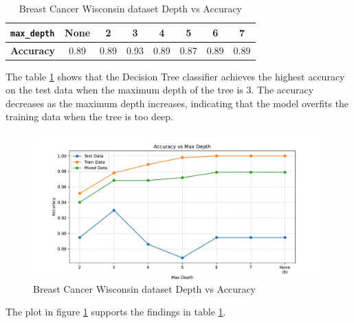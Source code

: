 \begin{table}[H]
    \centering
    \begin{tabular}{|l|c|c|c|c|c|c|c|}
        \hline
        \textbf{\texttt{max\_depth}} & None & 2 & 3 & 4 & 5 & 6 & 7 \\ \hline
        \textbf{Accuracy} & 0.89 & 0.89 & 0.93 & 0.89 & 0.87 & 0.89 & 0.89 \\ \hline
    \end{tabular}
    \caption{Breast Cancer Wisconsin dataset Depth vs Accuracy}
    \label{tab:breast_cancer_wisconsin_depth_vs_accuracy}
\end{table}

The table \ref{tab:breast_cancer_wisconsin_depth_vs_accuracy} shows that the Decision Tree classifier achieves the highest accuracy on the test data when the maximum depth of the tree is 3. The accuracy decreases as the maximum depth increases, indicating that the model overfits the training data when the tree is too deep.

\begin{figure}[H]
    \centering
    \includegraphics[width=\textwidth]{figures/breast_cancer_wisconsin_accuracy_vs_max_depth.pdf}
    \caption{Breast Cancer Wisconsin dataset Depth vs Accuracy}
    \label{fig:breast_cancer_wisconsin_depth_vs_accuracy}
\end{figure}

The plot in figure \ref{fig:breast_cancer_wisconsin_depth_vs_accuracy} supports the findings in table \ref{tab:breast_cancer_wisconsin_depth_vs_accuracy}.
